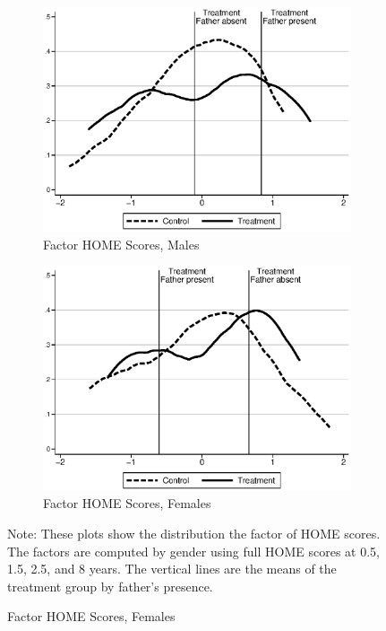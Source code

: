 \begin{figure}
\begin{center}
\caption{Density of the HOME Scores by Gender and Experimental Group}
\label{fig:total-home}

	\begin{subfigure}[b]{0.49\textwidth}
		\centering
		\caption{Factor HOME Scores, Males}
		\label{fig:home-male-factor}
			\includegraphics[width=\textwidth]{../output/HOME-males-factorhome}
	\end{subfigure}
	\begin{subfigure}[b]{0.49\textwidth}
		\centering
		\caption{Factor HOME Scores, Females}
		\label{fig:home-female-factor}
			\includegraphics[width=\textwidth]{../output/HOME-females-factorhome}
	\end{subfigure}
\end{center}
\raggedright
Note: These plots show the distribution the factor of HOME scores. The factors are computed by gender using full HOME scores at 0.5, 1.5, 2.5, and 8 years. The vertical lines are the means of the treatment group by father's presence. 
\end{figure}

